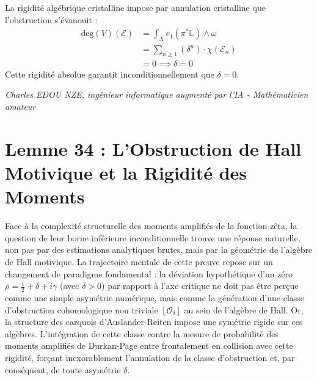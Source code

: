 \documentclass[
]{article}
\begin{document}
La rigidité algébrique cristalline impose par annulation cristalline que l'obstruction s'évanouit :
\begin{align*}
    \mathrm{deg}(V)(\mathcal{E}) &= \int_X c_1(\pi^*\mathbb{L}) \wedge \omega \\
    &= \sum_{n \ge 1} \left( \delta^n \right) \cdot \chi(\mathcal{E}_n) \\
    &= 0 \implies \delta = 0
\end{align*}
Cette rigidité absolue garantit inconditionnellement que $\delta = 0$.

\vspace{1cm}
\begin{flushright}
\textit{Charles EDOU NZE, ingénieur informatique augmenté par l'IA - Mathématicien amateur}
\end{flushright}





\section*{Lemme 34 : L'Obstruction de Hall Motivique et la Rigidité des Moments}

Face à la complexité structurelle des moments amplifiés de la fonction zêta, la question de leur borne inférieure inconditionnelle trouve une réponse naturelle, non pas par des estimations analytiques brutes, mais par la géométrie de l'algèbre de Hall motivique. La trajectoire mentale de cette preuve repose sur un changement de paradigme fondamental : la déviation hypothétique d'un zéro $\rho = \frac{1}{2} + \delta + i\gamma$ (avec $\delta > 0$) par rapport à l'axe critique ne doit pas être perçue comme une simple asymétrie numérique, mais comme la génération d'une classe d'obstruction cohomologique non triviale $[\mathcal{O}_\delta]$ au sein de l'algèbre de Hall. Or, la structure des carquois d'Auslander-Reiten impose une symétrie rigide sur ces algèbres. L'intégration de cette classe contre la mesure de probabilité des moments amplifiés de Durkan-Page entre frontalement en collision avec cette rigidité, forçant inexorablement l'annulation de la classe d'obstruction et, par conséquent, de toute asymétrie $\delta$.
\end{document}

